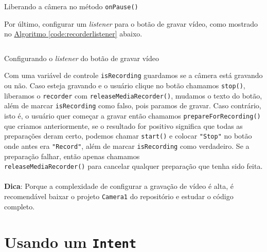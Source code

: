 \documentclass[a4paper,12pt,brazil,oneside]{book}
\begin{document}
\begin{singlespace}
		\begin{listing}[H]
		\inputminted[linenos=true,fontsize=\small,frame=lines, framesep=2mm, tabsize=2,numbersep=5pt]{java}{src/api/camera/releaseCam.java}
		\caption{Liberando a câmera no método \texttt{onPause()}}
		\label{code:releaserecorder2}
		\end{listing} 			

		Por último, configurar um \emph{listener} para o botão de gravar vídeo, como mostrado no \hyperref[code:recorderlistener]{Algoritmo \ref*{code:recorderlistener}} abaixo. 

		\begin{listing}[H]
		\inputminted[linenos=true,fontsize=\small,frame=lines, framesep=2mm, tabsize=2,numbersep=5pt]{java}{src/api/camera/recordlistener.java}
		\caption{Configurando o \emph{listener} do botão de gravar vídeo}
		\label{code:recorderlistener}
		\end{listing} 			

		Com uma variável de controle \texttt{isRecording} guardamos se a câmera está gravando ou não. Caso esteja gravando e o usuário clique no botão chamamos \texttt{stop()}, liberamos o \texttt{recorder} com \texttt{releaseMediaRecorder()}, mudamos o texto do botão, além de marcar \texttt{isRecording} como falso, pois paramos de gravar. Caso contrário, isto é, o usuário quer começar a gravar então chamamos \texttt{prepareForRecording()} que criamos anteriormente, se o resultado for positivo significa que todas as preparações deram certo, podemos chamar \texttt{start()} e colocar \texttt{"Stop"} no botão onde antes era \texttt{"Record"}, além de marcar \texttt{isRecording} como verdadeiro. Se a preparação falhar, então apenas chamamos \\ \texttt{releaseMediaRecorder()} para cancelar qualquer preparação que tenha sido feita.

\begin{framed}
\paragraph{}\textbf{Dica}: Porque a complexidade de configurar a gravação de vídeo é alta, é recomendável baixar o projeto \texttt{Camera1} do repositório e estudar o código completo.
\textit{}
\end{framed}

	\section{Usando um \texttt{Intent}}


\end{singlespace}
\end{document}
